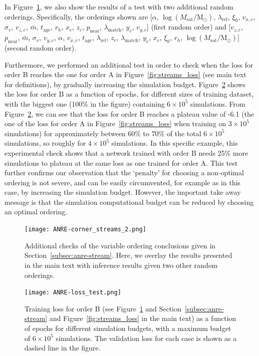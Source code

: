\begin{subappendices}
In Figure~\ref{fig:corner_streams_2}, we also show the results of a test with two additional random orderings. Specifically, the orderings shown are [$\alpha$, $\log(M_\mathrm{sat}/\mathrm{M}_\odot)$, $\lambda_\mathrm{rel}$, $\xi_0$, $v_{x,c}$, $\sigma_v$, $v_{z,c}$, $\bar{m}$, $t_\mathrm{age}$, $r_h$, $x_c$, $z_c$, $p_\mathrm{near}$, $\lambda_\mathrm{match}$, $y_c$, $v_{y,c}$] (first random order) and [$v_{z,c}$, $p_\mathrm{near}$, $\bar{m}$, $\sigma_v$, $v_{y,c}$, $\alpha$, $v_{x, c}$, $t_\mathrm{age}$, $\lambda_{\mathrm{rel}}$, $z_c$, $\lambda_\mathrm{match}$, $y_c$, $x_c$, $\xi_0$, $r_h$, $\log(M_\mathrm{sat}/\mathrm{M}_\odot)$] (second random order).

Furthermore, we performed an additional test in order to check when the loss for order B reaches the one for order A in Figure~\ref{fig:streams_loss} (see main text for definitions), by gradually increasing the simulation budget.
Figure~\ref{fig:anre-training} shows the loss for order B as a function of epochs, for different sizes of training dataset, with the biggest one (100\% in the figure) containing $6\times10^5$ simulations. From Figure~\ref{fig:anre-training}, we can see that the loss for order B reaches a plateau value of -6.1 (the one of the loss for order A in Figure~\ref{fig:streams_loss} when training on $3\times10^5$ simulations) for approximately between 60\% to 70\% of the total $6\times10^5$ simulations, so roughly for $4\times10^5$ simulations. In this specific example, this experimental check shows that a network trained with order B needs 25\% more simulations to plateau at the same loss as one trained for order A. This test further confirms our observation that the ‘penalty’ for choosing a non-optimal ordering is not severe, and can be easily circumvented, for example as in this case, by increasing the simulation budget. However, the important take away message is that the simulation computational budget can be reduced by choosing an optimal ordering. 

\begin{figure}
    \texttt{[image: ANRE-corner\_streams\_2.png]}
    \caption{Additional checks of the variable ordering conclusions given in Section~\ref{subsec:anre-stream}. Here, we overlay the results presented in the main text with inference results given two other random orderings.}
    \label{fig:corner_streams_2}
\end{figure}

\begin{figure}
    \centering
    \texttt{[image: ANRE-loss\_test.png]}
    \caption{Training loss for order B (see Figure~\ref{fig:corner_streams_2} and Section~\ref{subsec:anre-stream} and Figure~\ref{fig:streams_loss} in the main text) as a function of epochs for different simulation budgets, with a maximum budget of $6\times 10^5$ simulations. The validation loss for each case is shown as a dashed line in the figure.}
    \label{fig:anre-training}
\end{figure}


\end{subappendices}

